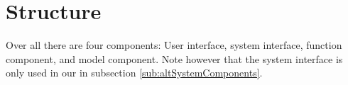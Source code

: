 \section{Structure}
Over all there are four components: User interface, system interface, function component, and model component.
Note however that the system interface is only used in our  in subsection \ref{sub:altSystemComponents}.
